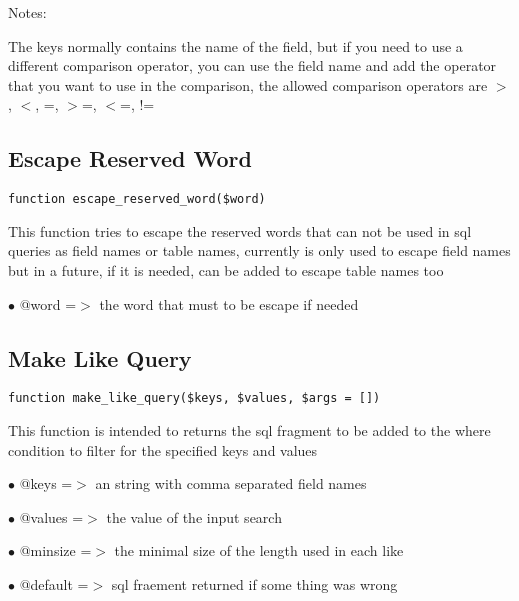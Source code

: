 \documentclass[a4paper]{book}
\begin{document}
Notes:

The keys normally contains the name of the field, but if you need to use
a different comparison operator, you can use the field name and add the
operator that you want to use in the comparison, the allowed comparison
operators are $>$, $<$, =, $>$=, $<$=, !=

\hypertarget{toc246}{}
\subsection{Escape Reserved Word}

\begin{lstlisting}
function escape_reserved_word($word)
\end{lstlisting}

This function tries to escape the reserved words that can not be used
in sql queries as field names or table names, currently is only used
to escape field names but in a future, if it is needed, can be added
to escape table names too

\begin{compactitem}
\item[\color{myblue}$\bullet$] @word =$>$ the word that must to be escape if needed
\end{compactitem}

\hypertarget{toc247}{}
\subsection{Make Like Query}

\begin{lstlisting}
function make_like_query($keys, $values, $args = [])
\end{lstlisting}

This function is intended to returns the sql fragment to be added to the
where condition to filter for the specified keys and values

\begin{compactitem}
\item[\color{myblue}$\bullet$] @keys    =$>$ an string with comma separated field names
\item[\color{myblue}$\bullet$] @values  =$>$ the value of the input search
\item[\color{myblue}$\bullet$] @minsize =$>$ the minimal size of the length used in each like
\item[\color{myblue}$\bullet$] @default =$>$ sql fraement returned if some thing was wrong
\end{compactitem}
\end{document}
